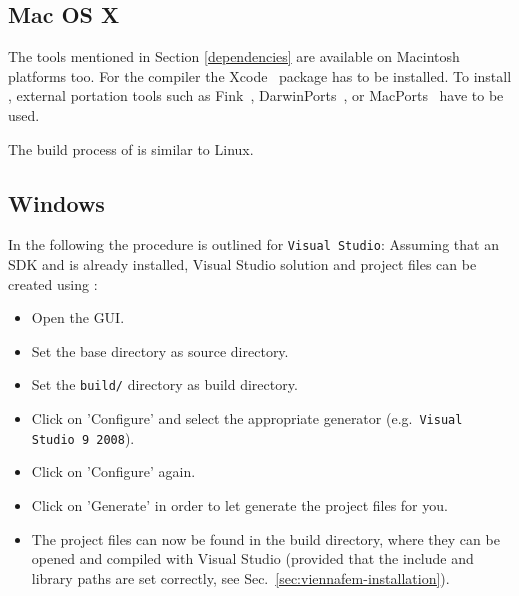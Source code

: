 
\subsection{Mac OS X}
\label{apple}
The tools mentioned in Section \ref{dependencies} are available on 
Macintosh platforms too. 
For the {\GCC} compiler the Xcode~\cite{xcode} package has to be installed.
To install {\CMake}, external portation tools such as
Fink~\cite{fink}, DarwinPorts~\cite{darwinports}, 
or MacPorts~\cite{macports} have to be used. 

The build process of {\ViennaFEM} is similar to Linux.

\subsection{Windows}
In the following the procedure is outlined for \texttt{Visual Studio}: Assuming
that an {\OpenCL} SDK and {\CMake} is already installed, Visual Studio solution
and project files can be created using {\CMake}:
\begin{itemize}
\item Open the {\CMake} GUI.
\item Set the {\ViennaFEM} base directory as source directory.
\item Set the \texttt{build/} directory as build directory.
\item Click on 'Configure' and select the appropriate generator
(e.g.~\texttt{Visual Studio 9 2008}).
\item Click on 'Configure' again.
\item Click on 'Generate' in order to let {\CMake} generate the project files for you.
\item The project files can now be found in the {\ViennaFEM} build directory,
where they can be opened and compiled with Visual Studio (provided that the
include and library paths are set correctly, see
Sec.~\ref{sec:viennafem-installation}).
\end{itemize}


























